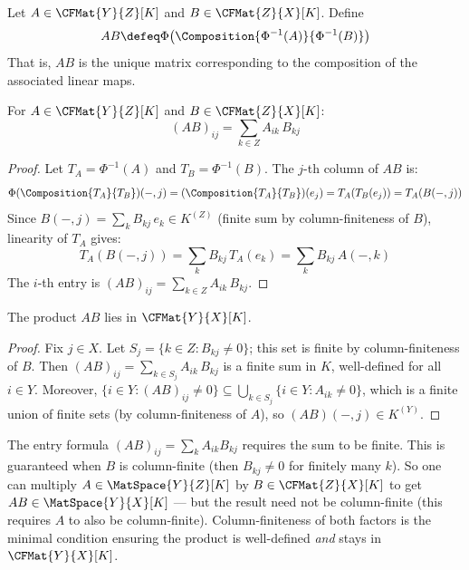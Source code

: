 \begin{definition}
\label{def:mat-mult}
    Let $A \in \CFMat{Y}{Z}[K]$ and $B \in \CFMat{Z}{X}[K]$. Define
    \[
        AB \defeq \Phi\bigl(\Composition{\Phi^{-1}(A)}{\Phi^{-1}(B)}\bigr)
    \]
    That is, $AB$ is the unique matrix corresponding to the composition of the associated
    linear maps.
\end{definition}

\begin{theorem}
\label{thm:entry-formula}
    For $A \in \CFMat{Y}{Z}[K]$ and $B \in \CFMat{Z}{X}[K]$:
    \[
        (AB)_{ij} = \sum_{k \in Z} A_{ik}\, B_{kj}
    \]
\end{theorem}

\begin{proof}
    Let $T_A = \Phi^{-1}(A)$ and $T_B = \Phi^{-1}(B)$. The $j$-th column of $AB$ is:
    \[
        \Phi(\Composition{T_A}{T_B})(-,j)
        = (\Composition{T_A}{T_B})(e_j)
        = T_A(T_B(e_j))
        = T_A(B(-,j))
    \]
    Since $B(-,j) = \sum_k B_{kj}\, e_k \in K^{(Z)}$ (finite sum by column-finiteness of
    $B$), linearity of $T_A$ gives:
    \[
        T_A(B(-,j)) = \sum_k B_{kj}\, T_A(e_k) = \sum_k B_{kj}\, A(-,k)
    \]
    The $i$-th entry is $(AB)_{ij} = \sum_{k \in Z} A_{ik}\, B_{kj}$.
\end{proof}

\begin{proposition}
\label{prop:mat-mult-wd}
    The product $AB$ lies in $\CFMat{Y}{X}[K]$.
\end{proposition}

\begin{proof}
    Fix $j \in X$. Let $S_j = \{k \in Z : B_{kj} \neq 0\}$; this set is finite by
    column-finiteness of $B$. Then
    $(AB)_{ij} = \sum_{k \in S_j} A_{ik}\, B_{kj}$
    is a finite sum in $K$, well-defined for all $i \in Y$.
    Moreover, $\{i \in Y : (AB)_{ij} \neq 0\}
    \subseteq \bigcup_{k \in S_j} \{i \in Y : A_{ik} \neq 0\}$,
    which is a finite union of finite sets (by column-finiteness of $A$),
    so $(AB)(-,j) \in K^{(Y)}$.
\end{proof}

\begin{remark}
    The entry formula $(AB)_{ij} = \sum_k A_{ik} B_{kj}$ requires the sum to be finite.
    This is guaranteed when $B$ is column-finite (then $B_{kj} \neq 0$ for finitely many $k$).
    So one can multiply $A \in \MatSpace{Y}{Z}[K]$ by $B \in \CFMat{Z}{X}[K]$ to get
    $AB \in \MatSpace{Y}{X}[K]$ --- but the result need not be column-finite (this requires
    $A$ to also be column-finite). Column-finiteness of both factors is the minimal condition
    ensuring the product is well-defined \emph{and} stays in $\CFMat{Y}{X}[K]$.
\end{remark}

